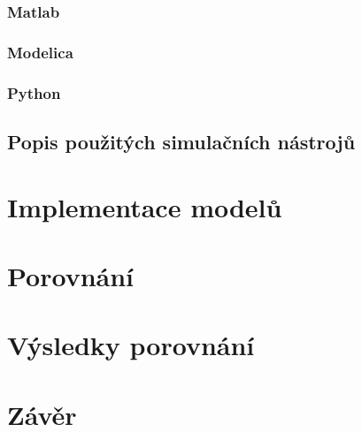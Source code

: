 \subsection{Matlab}

\subsection{Modelica}

\subsection{Python}

\section{Popis použitých simulačních nástrojů}

\chapter{Implementace modelů}
\label{kapitola4}

\chapter{Porovnání}
\label{kapitola5}

\chapter{Výsledky porovnání}
\label{kapitola6}

\chapter{Závěr}
\label{kapitola7}


